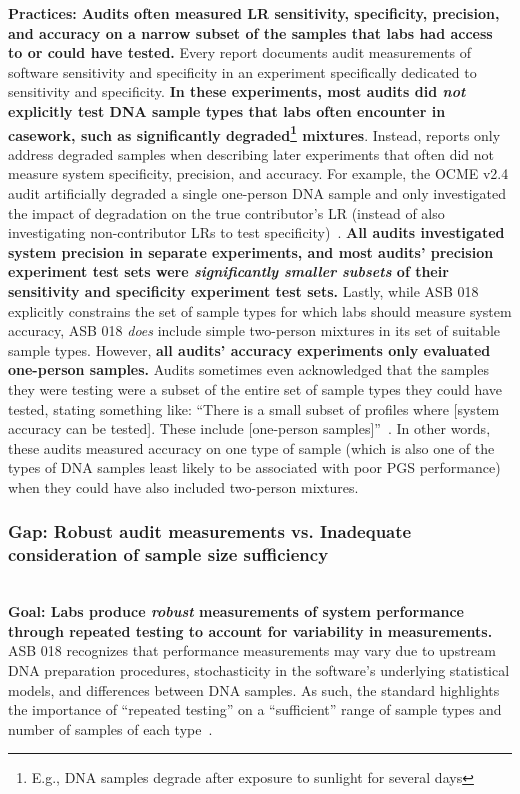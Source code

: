 \textbf{Practices: Audits often measured LR sensitivity, specificity, precision, and accuracy on a narrow subset of the samples that labs had access to or could have tested.} Every report documents audit measurements of software sensitivity and specificity in an experiment specifically dedicated to sensitivity and specificity. \textbf{In these experiments, most audits did \textit{not} explicitly test DNA sample types that labs often encounter in casework, such as significantly degraded\footnote{E.g., DNA samples degrade after exposure to sunlight for several days} mixtures}. Instead, reports only address degraded samples when describing later experiments that often did not measure system specificity, precision, and accuracy. For example, the OCME v2.4 audit artificially degraded a single one-person DNA sample and only investigated the impact of degradation on the true contributor's LR (instead of also investigating non-contributor LRs to test specificity)~\cite{ocmeIV}. \textbf{All audits investigated system precision in separate experiments, and most audits' precision experiment test sets were  \textit{significantly smaller subsets} of their sensitivity and specificity experiment test sets.} Lastly, while ASB 018 explicitly constrains the set of sample types for which labs should measure system accuracy, ASB 018 \textit{does} include simple two-person mixtures in its set of suitable sample types. However, \textbf{all audits' accuracy experiments only evaluated one-person samples.} Audits sometimes even acknowledged that the samples they were testing were a subset of the entire set of sample types they could have tested, stating something like: ``There is a small subset of profiles where [system accuracy can be tested]. These include [one-person samples]''~\cite[p.3]{ocmeIV}. In other words, these audits measured accuracy on one type of sample (which is also one of the types of DNA samples least likely to be associated with poor PGS performance) when they could have also included two-person mixtures.


\subsubsection{Gap: Robust audit measurements vs. Inadequate consideration of sample size sufficiency} 
\label{sec:performance-gap2}
\textbf{\\Goal: Labs produce \textit{robust} measurements of system performance through repeated testing to account for variability in measurements.} ASB 018 recognizes that performance measurements may vary due to upstream DNA preparation procedures, stochasticity in the software's underlying statistical models, and differences between DNA samples. As such, the standard highlights the importance of ``repeated testing'' on a ``sufficient'' range of sample types and number of samples of each type~\cite[Annex A, R4.1.3]{asb018}. 


